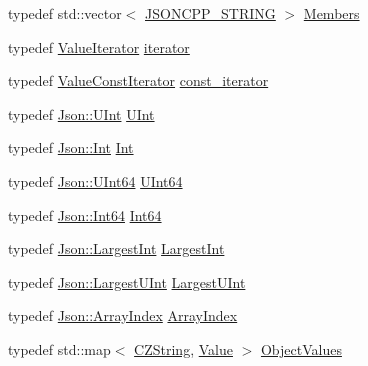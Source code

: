 \begin{DoxyCompactItemize}
\item 
typedef std\+::vector$<$ \hyperlink{config_8h_a1e723f95759de062585bc4a8fd3fa4be}{J\+S\+O\+N\+C\+P\+P\+\_\+\+S\+T\+R\+I\+NG} $>$ \hyperlink{class_json_1_1_value_a9ae9069983fc38f1928d76f9c79ac64d}{Members}
\item 
typedef \hyperlink{class_json_1_1_value_iterator}{Value\+Iterator} \hyperlink{class_json_1_1_value_a341cdf2e01f8b3c5b7317aa2f0768c53}{iterator}
\item 
typedef \hyperlink{class_json_1_1_value_const_iterator}{Value\+Const\+Iterator} \hyperlink{class_json_1_1_value_af92282ca92b58b320debd486afb7696a}{const\+\_\+iterator}
\item 
typedef \hyperlink{namespace_json_a800fb90eb6ee8d5d62b600c06f87f7d4}{Json\+::\+U\+Int} \hyperlink{class_json_1_1_value_a0933d59b45793ae4aade1757c322a98d}{U\+Int}
\item 
typedef \hyperlink{namespace_json_a08122e8005b706d982e48cca1e2119c7}{Json\+::\+Int} \hyperlink{class_json_1_1_value_abdf7a7ff73eb130ffcab28504ffdb405}{Int}
\item 
typedef \hyperlink{namespace_json_adf3fa5cb60c619e4f02315ad355e0ca1}{Json\+::\+U\+Int64} \hyperlink{class_json_1_1_value_a8b62564be8c087c6d18de180ff4e13e3}{U\+Int64}
\item 
typedef \hyperlink{namespace_json_ac62566f36fd33115957b91305c9ed1dc}{Json\+::\+Int64} \hyperlink{class_json_1_1_value_a1b86af9f85f0f1baa972c3319fa22695}{Int64}
\item 
typedef \hyperlink{namespace_json_a218d880af853ce786cd985e82571d297}{Json\+::\+Largest\+Int} \hyperlink{class_json_1_1_value_a1cbb82642ed05109b9833e49f042ece7}{Largest\+Int}
\item 
typedef \hyperlink{namespace_json_ae202ecad69725e23443f465e257456d0}{Json\+::\+Largest\+U\+Int} \hyperlink{class_json_1_1_value_a6682a3684d635e03fc06ba229fa24eec}{Largest\+U\+Int}
\item 
typedef \hyperlink{namespace_json_a8048e741f2177c3b5d9ede4a5b8c53c2}{Json\+::\+Array\+Index} \hyperlink{class_json_1_1_value_a184a91566cccca7b819240f0d5561c7d}{Array\+Index}
\item 
typedef std\+::map$<$ \hyperlink{class_json_1_1_value_1_1_c_z_string}{C\+Z\+String}, \hyperlink{class_json_1_1_value}{Value} $>$ \hyperlink{class_json_1_1_value_a08b6c80c3af7071d908dabf044de5388}{Object\+Values}
\end{DoxyCompactItemize}
